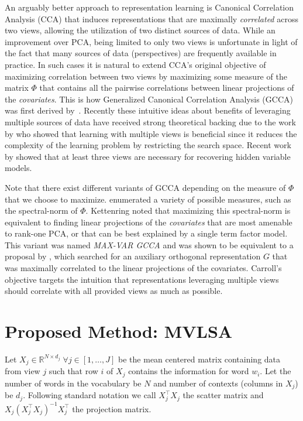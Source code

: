 \documentclass[11pt]{article}
\begin{document}
An arguably better approach to representation learning is Canonical
Correlation Analysis (CCA) that induces representations that are
maximally \emph{correlated} across two views, allowing the utilization
of two distinct sources of data. While an improvement over PCA, being
limited to only two views is unfortunate in light of the fact that
many sources of data (perspectives) are frequently available in
practice.  In such cases it is natural to extend CCA's original
objective of maximizing correlation between two views by maximizing
some measure of the matrix $\Phi$ that contains all the pairwise
correlations between linear projections of the \emph{covariates}. This
is how Generalized Canonical Correlation Analysis (GCCA) was first
derived by~. Recently these intuitive
ideas about benefits of leveraging multiple sources of data have 
received strong theoretical backing due to the work by
 who showed that learning with
multiple views is beneficial since it reduces the complexity of the
learning problem by restricting the search space.  Recent work by
 showed that at least three views are
necessary for recovering hidden variable models.

Note that there exist different variants of GCCA depending on the
measure of $\Phi$ that we choose to
maximize.  enumerated a variety of
possible measures, such as the spectral-norm of $\Phi$. Kettenring
noted that maximizing this spectral-norm is equivalent to finding
linear projections of the \emph{covariates} that are most amenable to
rank-one PCA, or that can be best explained by a single term factor
model. This variant was named \emph{MAX-VAR GCCA} and was shown to be
equivalent to a proposal by , which
searched for an auxiliary orthogonal representation $G$ that was
maximally correlated to the linear projections of the
covariates.  Carroll's objective targets the intuition
that representations leveraging multiple views should correlate with
all provided views as much as possible.

\section{Proposed Method: MVLSA}
\label{sec:gcca}
Let $X_j \in \mathbb{R}^{N\times d_j} \;
\forall j \in [1,\ldots,J]$ be the mean centered matrix containing
data from view $j$ such that row $i$ of $X_j$ contains the information for
word $w_i$. Let the number of words in the vocabulary be $N$
and number of contexts (columns in $X_j$) be $d_j$. %
Following standard
notation \cite{hastie2009elements} we call $X_j^\top X_j$ the scatter
matrix and $X_j (X_j^\top X_j)^{-1}X_j^\top$ the projection matrix.
\end{document}
